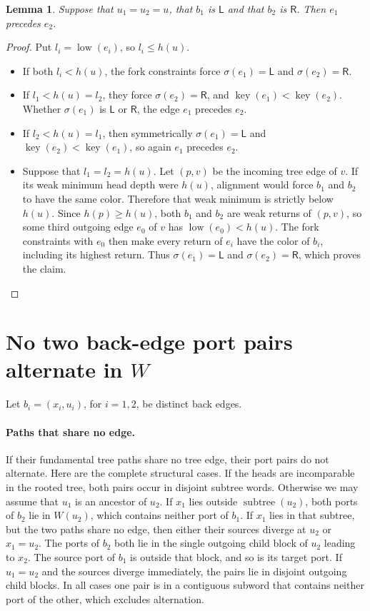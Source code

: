 \documentclass[11pt]{article}
\newcommand{\lemmaname}{}
\newtheorem*{namedlemma}{Lemma \lemmaname}
\newenvironment{lem}[1]{\renewcommand{\lemmaname}{#1}\begin{namedlemma}}{\end{namedlemma}}
\DeclareMathOperator{\low}{low}
\DeclareMathOperator{\key}{key}
\DeclareMathOperator{\subtree}{subtree}
\newcommand{\cL}{\mathsf{L}}
\newcommand{\cR}{\mathsf{R}}
\begin{document}
\begin{lem}{(B)}
Suppose that $u_1=u_2=u$, that $b_1$ is $\cL$ and that $b_2$ is $\cR$. Then
$e_1$ precedes $e_2$.
\end{lem}

\begin{proof}
Put $l_i=\low(e_i)$, so $l_i\le h(u)$.
\begin{itemize}[nosep]
\item If both $l_i<h(u)$, the fork constraints force $\sigma(e_1)=\cL$ and
$\sigma(e_2)=\cR$.
\item If $l_1<h(u)=l_2$, they force $\sigma(e_2)=\cR$, and
$\key(e_1)<\key(e_2)$. Whether $\sigma(e_1)$ is $\cL$ or $\cR$, the edge $e_1$
precedes $e_2$.
\item If $l_2<h(u)=l_1$, then symmetrically $\sigma(e_1)=\cL$ and
$\key(e_2)<\key(e_1)$, so again $e_1$ precedes $e_2$.
\item Suppose that $l_1=l_2=h(u)$. Let $(p,v)$ be the incoming tree edge of $v$.
If its weak minimum head depth were $h(u)$, alignment would force $b_1$ and
$b_2$ to have the same color. Therefore that weak minimum is strictly below
$h(u)$. Since $h(p)\ge h(u)$, both $b_1$ and $b_2$ are weak returns of $(p,v)$,
so some third outgoing edge $e_0$ of $v$ has $\low(e_0)<h(u)$. The fork
constraints with $e_0$ then make every return of $e_i$ have the color of $b_i$,
including its highest return. Thus $\sigma(e_1)=\cL$ and $\sigma(e_2)=\cR$,
which proves the claim.\qedhere
\end{itemize}
\end{proof}

\section{No two back-edge port pairs alternate in \texorpdfstring{$W$}{W}}

Let $b_i=(x_i,u_i)$, for $i=1,2$, be distinct back edges.

\paragraph{Paths that share no edge.}
If their fundamental tree paths share no tree edge, their port pairs do not
alternate. Here are the complete structural cases. If the heads are
incomparable in the rooted tree, both pairs occur in disjoint subtree words.
Otherwise we may assume that $u_1$ is an ancestor of $u_2$. If $x_1$ lies
outside $\subtree(u_2)$, both ports of $b_2$ lie in $W(u_2)$, which contains
neither port of $b_1$. If $x_1$ lies in that subtree, but the two paths share
no edge, then either their sources diverge at $u_2$ or $x_1=u_2$. The ports of
$b_2$ both lie in the single outgoing child block of $u_2$ leading to $x_2$.
The source port of $b_1$ is outside that block, and so is its target port. If
$u_1=u_2$ and the sources diverge immediately, the pairs lie in disjoint
outgoing child blocks. In all cases one pair is in a contiguous subword that
contains neither port of the other, which excludes alternation.
\end{document}
